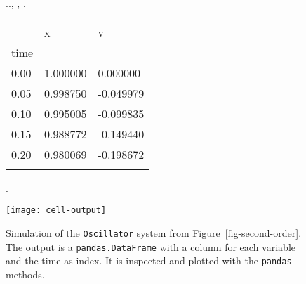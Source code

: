 \begin{figure}[t]
  \begin{minipage}[t]{\columnwidth}
    \begin{CodeInput}
    \begin{Highlighting}[]
       
       
    
     \OperatorTok{=} 
     \OperatorTok{=} .\KeywordTok{(}\OperatorTok{=}.\KeywordTok{(}, , \KeywordTok{))}
    .\KeywordTok{()}
    \end{Highlighting}
    \end{CodeInput}
    \begin{CodeOutput}
        \begin{tabular}[]{@{}lll@{}}
            \toprule
            & x & v \\
            time & & \\
            \midrule
            0.00 & 1.000000 & 0.000000 \\
            0.05 & 0.998750 & -0.049979 \\
            0.10 & 0.995005 & -0.099835 \\
            0.15 & 0.988772 & -0.149440 \\
            0.20 & 0.980069 & -0.198672 \\
            \botrule
        \end{tabular}
    \end{CodeOutput}
  \end{minipage}%
  \hfill
  \begin{minipage}[t]{\columnwidth}
    \begin{CodeInput}
    \begin{Highlighting}[]
    .\KeywordTok{()}
    \end{Highlighting}
    \end{CodeInput}
    \begin{CodeOutput}
      \texttt{[image: cell-output]}
    \end{CodeOutput}
  \end{minipage}%
  
  \caption{\label{fig-sim}Simulation of the \texttt{Oscillator} system
  from Figure~\ref{fig-second-order}. The output is a
  \texttt{pandas.DataFrame} with a column for each variable and the time
  as index. It is inspected and plotted with the \texttt{pandas} methods.}
\end{figure}
  
